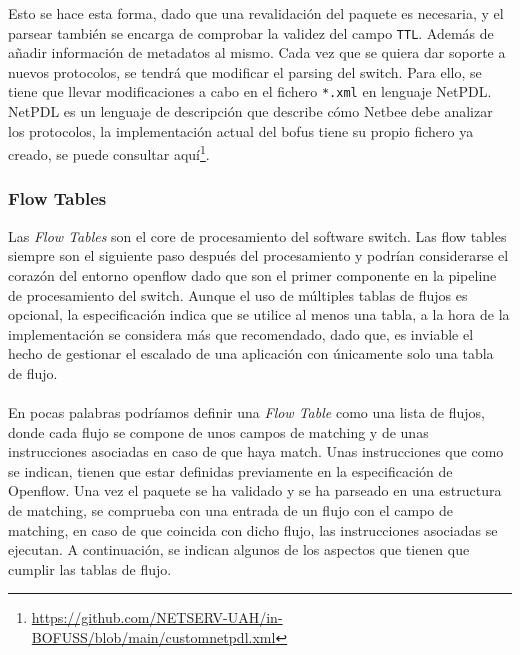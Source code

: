 Esto se hace esta forma, dado que una revalidación del paquete es necesaria, y el parsear también se encarga de comprobar la validez del campo \texttt{TTL}. Además de añadir información de metadatos al mismo. Cada vez que se quiera dar soporte a nuevos protocolos, se tendrá que modificar el parsing del switch. Para ello, se tiene que llevar modificaciones a cabo en el fichero \texttt{*.xml} en lenguaje NetPDL. NetPDL es un lenguaje de descripción que describe cómo Netbee debe analizar los protocolos, la implementación actual del \gls{bofus} tiene su propio fichero ya creado, se puede consultar aquí\footnote{\url{https://github.com/NETSERV-UAH/in-BOFUSS/blob/main/customnetpdl.xml}}.

\subsubsection{Flow Tables}

Las \textit{Flow Tables} son el core de procesamiento del software switch. Las flow tables siempre son el siguiente paso después del procesamiento y podrían considerarse el corazón del entorno openflow dado que son el primer componente en la pipeline de procesamiento del switch. Aunque el uso de múltiples tablas de flujos es opcional, la especificación indica que se utilice al menos una tabla, a la hora de la implementación se considera más que recomendado, dado que, es inviable el hecho de gestionar el escalado de una aplicación con únicamente solo una tabla de flujo. \\
\\
En pocas palabras podríamos definir una  \textit{Flow Table} como una lista de flujos, donde cada flujo se compone de unos campos de matching y de unas instrucciones asociadas en caso de que haya match. Unas instrucciones que como se indican, tienen que estar definidas previamente en la especificación de Openflow. Una vez el paquete se ha validado y se ha parseado en una estructura de matching, se comprueba con una entrada de un flujo con el campo de matching, en caso de que coincida con dicho flujo, las instrucciones asociadas se ejecutan. A continuación, se indican algunos de los aspectos que tienen que cumplir las tablas de flujo.

